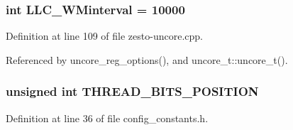 \subsubsection[{LLC\_\-WMinterval}]{\setlength{\rightskip}{0pt plus 5cm}int {\bf LLC\_\-WMinterval} = 10000\hspace{0.3cm}{\tt  [static]}}\label{zesto-uncore_8cpp_06d07595aba3e8c43653e36469238db5}




Definition at line 109 of file zesto-uncore.cpp.

Referenced by uncore\_\-reg\_\-options(), and uncore\_\-t::uncore\_\-t().
\subsubsection[{THREAD\_\-BITS\_\-POSITION}]{\setlength{\rightskip}{0pt plus 5cm}unsigned int {\bf THREAD\_\-BITS\_\-POSITION}}\label{zesto-uncore_8cpp_581f0c063e972c5f202149f2e3ce7452}




Definition at line 36 of file config\_\-constants.h.